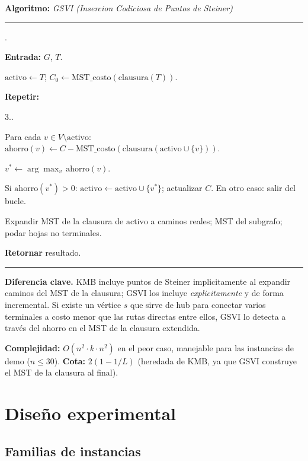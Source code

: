 \documentclass[11pt]{article}
\newcounter{pcstep}
\newcounter{innerpc}
\newcounter{innerpcb}
\newenvironment{pseudocode}[1]{%
  \medskip
  \noindent\textbf{Algoritmo:} \textit{#1}\\
  \noindent\rule{\linewidth}{0.4pt}
  \begin{list}{\arabic{pcstep}.}{\usecounter{pcstep}%
    \setlength{\leftmargin}{2em}\setlength{\itemsep}{2pt}}
}{%
  \end{list}
  \noindent\rule{\linewidth}{0.4pt}
  \medskip
}
\begin{document}
\begin{pseudocode}{GSVI (Insercion Codiciosa de Puntos de Steiner)}
  \item \textbf{Entrada:} $G$, $T$.
  \item $\mathrm{activo} \gets T$;
        $C_0 \gets \mathrm{MST\_costo}(\mathrm{clausura}(T))$.
  \item \textbf{Repetir:}
    \begin{list}{3..}{%
      \setlength{\leftmargin}{3em}\setlength{\itemsep}{1pt}}
      \item Para cada $v\in V\setminus\mathrm{activo}$:
            $\mathrm{ahorro}(v)\gets C-\mathrm{MST\_costo}(\mathrm{clausura}(\mathrm{activo}\cup\{v\}))$.
      \item $v^*\gets\arg\max_v\,\mathrm{ahorro}(v)$.
      \item Si $\mathrm{ahorro}(v^*)>0$: $\mathrm{activo}\gets\mathrm{activo}\cup\{v^*\}$;
            actualizar $C$.
            En otro caso: salir del bucle.
    \end{list}
  \item Expandir MST de la clausura de $\mathrm{activo}$ a caminos reales;
        MST del subgrafo; podar hojas no terminales.
  \item \textbf{Retornar} resultado.
\end{pseudocode}

\textbf{Diferencia clave.}  KMB incluye puntos de Steiner implicitamente al
expandir caminos del MST de la clausura; GSVI los incluye \emph{explicitamente}
y de forma incremental.  Si existe un v\'ertice $s$ que sirve de hub para
conectar varios terminales a costo menor que las rutas directas entre ellos,
GSVI lo detecta a trav\'es del ahorro en el MST de la clausura extendida.

\textbf{Complejidad:} $O(n^2\cdot k\cdot n^2)$ en el peor caso, manejable para
las instancias de demo ($n\le 30$).
\textbf{Cota:} $2(1-1/L)$ (heredada de KMB, ya que GSVI construye el MST de la
clausura al final).

\section{Dise\~no experimental}\label{sec:exp-design}

\subsection{Familias de instancias}
\end{document}
